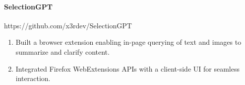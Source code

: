 \documentclass{article}
\begin{document}
\paragraph{SelectionGPT}\hfill https://github.com/x3rdev/SelectionGPT
\begin{enumerate}[label=$\bullet$]
    \item Built a browser extension enabling in-page querying of text and images to summarize and clarify content.
    \item Integrated Firefox WebExtensions APIs with a client-side UI for seamless interaction.
\end{enumerate}\vspace{-1.25em}
\end{document}
